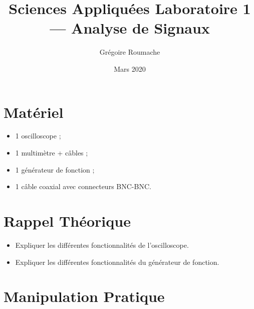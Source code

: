 \documentclass[a4paper]{article}
\title{Sciences Appliquées Laboratoire 1 --- Analyse de Signaux}
\author{Grégoire Roumache}
\date{Mars 2020}
\begin{document}
\maketitle















\section{Matériel}





\begin{itemize}
    \item 1 oscilloscope ;
    \item 1 multimètre + câbles ;
    \item 1 générateur de fonction ;
    \item 1 câble coaxial avec connecteurs BNC-BNC.
\end{itemize}















\section{Rappel Théorique}





\begin{itemize}
\item Expliquer les différentes fonctionnalités de l'oscilloscope.
\item Expliquer les différentes fonctionnalités du générateur de fonction.
\end{itemize}















\section{Manipulation Pratique}
\end{document}
